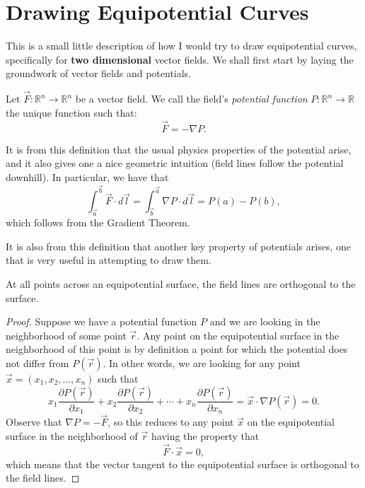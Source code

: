 \documentclass[a4paper, 12pt]{article}
\begin{document}
\section*{Drawing Equipotential Curves}

This is a small little description of how I would try to draw equipotential curves, specifically for \textbf{two dimensional} vector fields. We shall first start by laying the groundwork of vector fields and potentials.

\begin{sidebox}
    \begin{definition}
            Let \( \vec{F} \colon \mathbb{R}^n \to \mathbb{R}^n \) be a vector field. We call the field's \textit{potential function} \( P \colon \mathbb{R}^n \to \mathbb{R} \) the unique function such that:
        \[
            \vec{F} = - \nabla P
        .\]
    \end{definition}
\end{sidebox}

It is from this definition that the usual physics properties of the potential arise, and it also gives one a nice geometric intuition (field lines follow the potential downhill). In particular, we have that
\[
    \int_{\vec{a}}^{\vec{b}} \vec{F} \cdot d\vec{l} = \int_{\vec{b}}^{\vec{a}} \nabla P \cdot d\vec{l} = P(a) - P(b)
,\]
which follows from the Gradient Theorem.

It is also from this definition that another key property of potentials arises, one that is very useful in attempting to draw them.

\begin{sidebox}
    \begin{claim}
        At all points across an equipotential surface, the field lines are orthogonal to the surface.
    \end{claim}
\end{sidebox}

\begin{proof}
    Suppose we have a potential function \( P \) and we are looking in the neighborhood of some point \( \vec{r} \). Any point on the equipotential surface in the neighborhood of this point is by definition a point for which the potential does not differ from \( P(\vec{r}) \). In other words, we are looking for any point \( \vec{x} = (x_1, x_2, \ldots, x_n) \) such that
    \[
        x_1 \frac{\partial P(\vec{r})}{\partial x_1} + x_2 \frac{\partial P(\vec{r})}{\partial x_2} + \cdots + x_n \frac{\partial P(\vec{r})}{\partial x_n} = \vec{x} \cdot \nabla P(\vec{r}) = 0
    .\]
    Observe that \( \nabla P = - \vec{F} \), so this reduces to any point \( \vec{x} \) on the equipotential surface in the neighborhood of \( \vec{r} \) having the property that
    \[
        \vec{F} \cdot \vec{x} = 0
    ,\]
    which means that the vector tangent to the equipotential surface is orthogonal to the field lines.
\end{proof}
\end{document}
